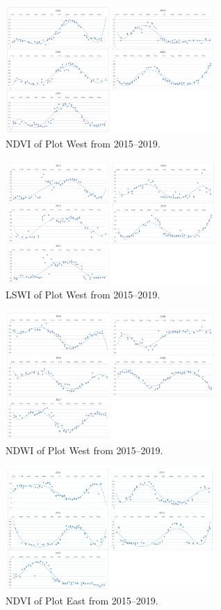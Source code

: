 \documentclass[a4paper, 10pt, conference]{ieeeconf}      %
\begin{document}
\begin{figure}[h]
\centering
\includegraphics[width=8cm]{Figures/NDVI_west.png}
\caption{NDVI of Plot West from 2015–2019.}
\label{fig:ndviwest}
\end{figure}

\begin{figure}[h]
\centering
\includegraphics[width=8cm]{Figures/LSWI_west.png}
\caption{LSWI of Plot West from 2015–2019.}
\label{fig:lswiwest}
\end{figure}

\begin{figure}[h]
\centering
\includegraphics[width=8cm]{Figures/NDWI_west.png}
\caption{NDWI of Plot West from 2015–2019.}
\label{fig:ndwiwest}
\end{figure}

\begin{figure}[h]
\centering
\includegraphics[width=8cm]{Figures/NDVI_east.png}
\caption{NDVI of Plot East from 2015–2019.}
\label{fig:ndvieast}
\end{figure}
\end{document}
